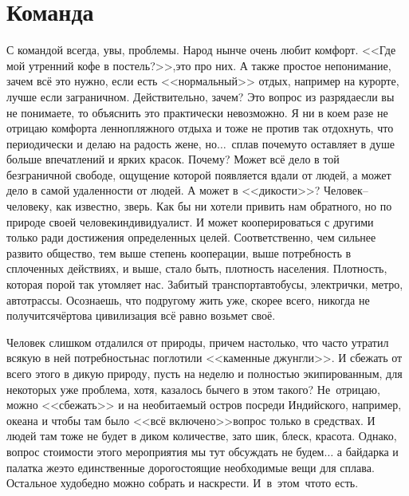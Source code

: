 \chapter{Команда} 

С командой всегда, увы, проблемы. Народ нынче очень любит комфорт. <<Где мой утренний кофе в постель?>>,\mdash это про них. А также простое непонимание, зачем всё это нужно, если есть <<нормальный>> отдых, например на курорте, лучше если заграничном. Действительно, зачем? Это вопрос из разряда\mdash если вы не понимаете, то объяснить это практически невозможно. Я ни в коем разе не отрицаю комфорта ленно\sdash пляжного отдыха и тоже не против так отдохнуть, что периодически и делаю на радость жене, но$\ldots$~сплав почему\sdash то оставляет в душе больше впечатлений и ярких красок. Почему? Может всё дело в той безграничной свободе, ощущение которой появляется вдали от людей, а может дело в самой удаленности от людей. А может в <<дикости>>? Человек\thinspace--\thinspace человеку, как известно, зверь. Как бы ни хотели привить нам обратного, но по природе своей человек\mdash индивидуалист. И может кооперироваться с другими только ради достижения определенных целей. Соответственно, чем сильнее развито общество, тем выше степень кооперации, выше потребность в сплоченных действиях, и выше, стало быть, плотность населения. Плотность, которая порой так утомляет нас. Забитый транспорт\mdash автобусы, электрички, метро, автотрассы. Осознаешь, что по\sdash другому жить уже, скорее всего, никогда не получится\mdash чёртова цивилизация всё равно возьмет своё.

Человек слишком отдалился от природы, причем настолько, что часто утратил всякую в ней потребность\mdash нас поглотили <<каменные джунгли>>. И сбежать от всего этого в дикую природу, пусть на неделю и полностью экипированным, для некоторых уже проблема, хотя, казалось бы\mdash чего в этом такого? Не~отрицаю, можно <<сбежать>> и на необитаемый остров посреди Индийского, например, океана и чтобы там было <<всё включено>>\mdash вопрос только в средствах. И людей там тоже не будет в диком количестве, зато шик, блеск, красота. Однако, вопрос стоимости этого мероприятия мы тут обсуждать не будем$\ldots$ а байдарка и палатка же\mdash это единственные дорогостоящие необходимые вещи для сплава. Остальное худо\sdash бедно можно собрать и наскрести. И~в~этом~что\sdash то есть. 

